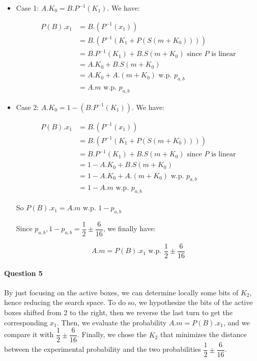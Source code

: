 \documentclass[a4paper]{article}
\begin{document}
\begin{itemize}

\item Case 1: $A . K_0 = B . P^{-1}(K_1)$. We have:

\begin{align*}
P(B).x_1 &= B.(P^{-1}(x_1)) \\
	&= B.(P^{-1}(K_1 + P(S(m + K_0)))) \\
	&= B.P^{-1}(K_1) + B.S(m + K_0) \text{ since $P$ is linear} \\
	&= A.K_0 + B.S(m + K_0) \\
	&= A.K_0 + A.(m + K_0) \text{ w.p. $p_{a,b}$} \\
	&= A.m \text{ w.p. $p_{a,b}$}
\end{align*}

\item Case 2: $A . K_0 = 1 - (B . P^{-1}(K_1))$. We have:

\begin{align*}
P(B).x_1 &= B.(P^{-1}(x_1)) \\
	&= B.(P^{-1}(K_1 + P(S(m + K_0)))) \\
	&= B.P^{-1}(K_1) + B.S(m + K_0) \text{ since $P$ is linear} \\
	&= 1 - A.K_0 + B.S(m + K_0) \\
	&= 1 - A.K_0 + A.(m + K_0) \text{ w.p. $p_{a,b}$} \\
	&= 1 - A.m \text{ w.p. $p_{a,b}$}
\end{align*}

So $P(B).x_1 = A.m$ w.p. $1 - p_{a,b}$

Since $p_{a,b}, 1 - p_{a,b} = \dfrac{1}{2} \pm \dfrac{6}{16}$, we finally have:

\begin{equation*}
A.m = P(B).x_1 \text{ w.p. } \dfrac{1}{2} \pm \dfrac{6}{16}
\end{equation*}

\end{itemize}

\paragraph{Question 5}

By just focusing on the active boxes, we can determine locally some bits of $K_2$, hence reducing the search space. To do so, we hypothesize the bits of the active boxes shifted from 2 to the right, then we reverse the last turn to get the corresponding $x_1$. Then, we evaluate the probability $A.m = P(B).x_1$, and we compare it with $\dfrac{1}{2} \pm \dfrac{6}{16}$. Finally, we chose the $K_2$ that minimizes the distance between the experimental probability and the two probabilities $\dfrac{1}{2} \pm \dfrac{6}{16}$.
\end{document}
